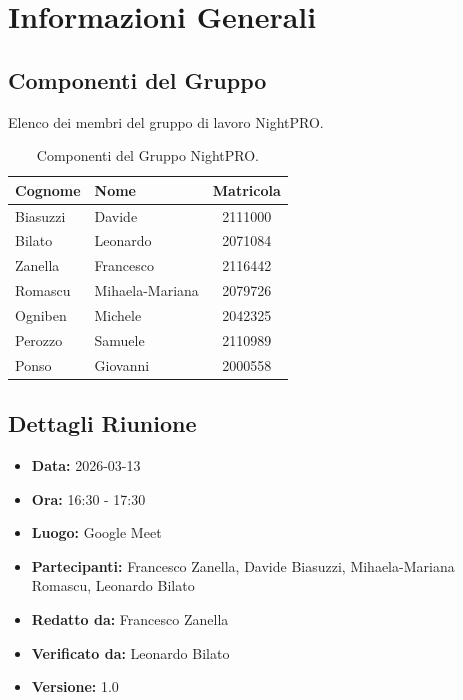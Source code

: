 \documentclass[a4paper, 11pt, oneside]{scrartcl} %
\begin{document}
\section{Informazioni Generali}

\subsection{Componenti del Gruppo}
Elenco dei membri del gruppo di lavoro NightPRO.
\begin{table}[h!]
\centering
\begin{tabular}{@{}llc@{}}
\toprule
\textbf{Cognome} & \textbf{Nome} & \textbf{Matricola} \\
\midrule
Biasuzzi & Davide & 2111000 \\
Bilato & Leonardo & 2071084 \\
Zanella & Francesco & 2116442 \\
Romascu & Mihaela-Mariana & 2079726 \\
Ogniben & Michele & 2042325 \\
Perozzo & Samuele & 2110989 \\
Ponso & Giovanni & 2000558 \\
\bottomrule
\end{tabular}
\caption{Componenti del Gruppo NightPRO.}
\end{table}

\subsection{Dettagli Riunione}
\begin{itemize}
    \item \textbf{Data:} 2026-03-13
    \item \textbf{Ora:} 16:30 - 17:30
    \item \textbf{Luogo:} Google Meet
    \item \textbf{Partecipanti:} Francesco Zanella, Davide Biasuzzi, Mihaela-Mariana Romascu, Leonardo Bilato
    \item \textbf{Redatto da:} Francesco Zanella
    \item \textbf{Verificato da:} Leonardo Bilato
    \item \textbf{Versione:} 1.0
\end{itemize}


\newpage
\end{document}
